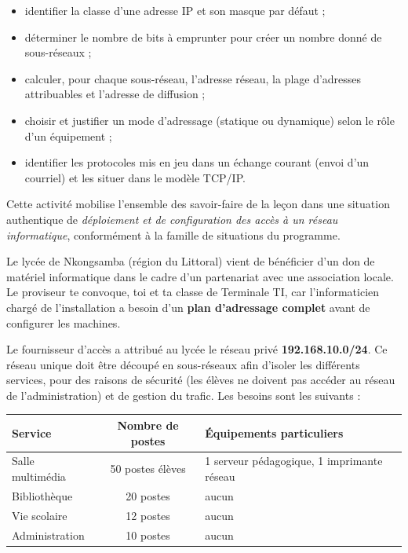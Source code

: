 \documentclass[11pt]{article}
\newcommand{\cle}[1]{{\popxbold\color{popdark}#1}}
\newcounter{popsec}
\newcounter{popsub}
\newcommand{\courssub}[1]{%
  \stepcounter{popsub}%
  \par\vspace{9pt}\noindent{\popxbold\fontsize{11.5}{13}\selectfont\color{popink}{\color{poporange}\thepopsec.\thepopsub}\hspace{6pt}#1}\par\nopagebreak\vspace{4pt}
}
\begin{document}
\begin{itemize}
\item identifier la classe d'une adresse IP et son masque par défaut ;
\item déterminer le nombre de bits à emprunter pour créer un nombre donné de sous-réseaux ;
\item calculer, pour chaque sous-réseau, l'\cle{adresse réseau}, la \cle{plage d'adresses attribuables} et l'\cle{adresse de diffusion} ;
\item choisir et justifier un mode d'adressage (\cle{statique} ou \cle{dynamique}) selon le rôle d'un équipement ;
\item identifier les \cle{protocoles} mis en jeu dans un échange courant (envoi d'un courriel) et les situer dans le modèle TCP/IP.
\end{itemize}

Cette activité mobilise l'ensemble des savoir-faire de la leçon dans une situation authentique de \emph{déploiement et de configuration des accès à un réseau informatique}, conformément à la famille de situations du programme.

\courssub{Situation}

Le lycée de Nkongsamba (région du Littoral) vient de bénéficier d'un don de matériel informatique dans le cadre d'un partenariat avec une association locale. Le proviseur te convoque, toi et ta classe de Terminale TI, car l'informaticien chargé de l'installation a besoin d'un \textbf{plan d'adressage complet} avant de configurer les machines.

Le fournisseur d'accès a attribué au lycée le réseau privé \textbf{192.168.10.0/24}. Ce réseau unique doit être découpé en sous-réseaux afin d'isoler les différents services, pour des raisons de sécurité (les élèves ne doivent pas accéder au réseau de l'administration) et de gestion du trafic. Les besoins sont les suivants :

\begin{center}
\begin{tabularx}{\linewidth}{|l|c|X|}
\hline
\rowcolor{popblueL} \textbf{Service} & \textbf{Nombre de postes} & \textbf{Équipements particuliers} \\
\hline
Salle multimédia & 50 postes élèves & 1 serveur pédagogique, 1 imprimante réseau \\
\hline
Bibliothèque & 20 postes & aucun \\
\hline
Vie scolaire & 12 postes & aucun \\
\hline
Administration & 10 postes & aucun \\
\hline
\end{tabularx}
\end{center}
\end{document}
